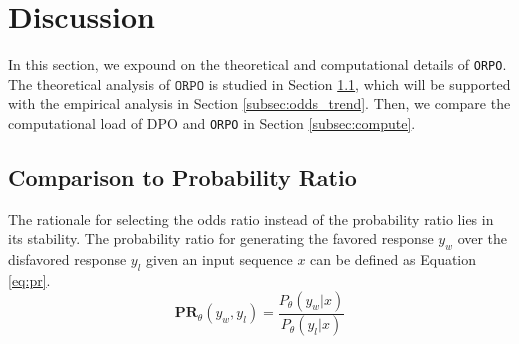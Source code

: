 \begin{table}[hbt!]
\centering
{}
\caption{Lexical diversity of Phi-2 and Llama-2 fine-tuned with DPO and \texttt{ORPO}. Lower cosine similarity is equivalent to higher diversity. The highest value in each column within the same model family is bolded.}
\label{tab:diversity}
\end{table}

\section{Discussion}

In this section, we expound on the theoretical and computational details of \texttt{ORPO}. The theoretical analysis of $\texttt{ORPO}$ is studied in Section \ref{subsec:why}, which will be supported with the empirical analysis in Section \ref{subsec:odds_trend}. Then, we compare the computational load of DPO and \texttt{ORPO} in Section \ref{subsec:compute}.

\subsection{Comparison to Probability Ratio}\label{subsec:why}

The rationale for selecting the odds ratio instead of the probability ratio lies in its stability. The probability ratio for generating the favored response $y_w$ over the disfavored response $y_l$ given an input sequence $x$ can be defined as Equation \ref{eq:pr}. 
\begin{equation}
    \textbf{PR}_\theta(y_w, y_l) = \frac{P_\theta(y_w|x)}{P_\theta(y_l|x)}\label{eq:pr}
\end{equation}

